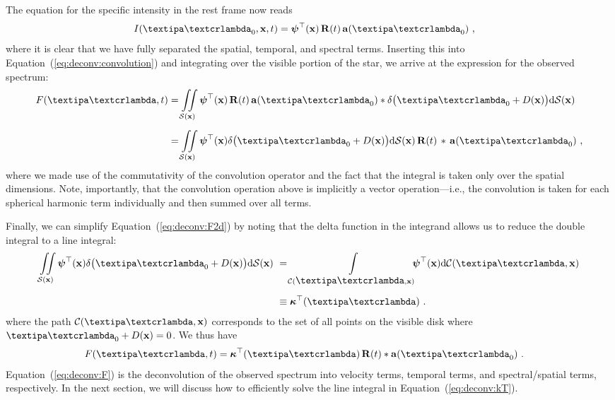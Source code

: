 \documentclass[modern]{aastex631}
\begin{document}
The equation for the specific intensity in the rest frame now reads
%
\begin{align}
    \label{eq:deconv:Ivecfull}
    I(\lnlam_0, \x, t) & =
    \ylmbasis(\x)
    \,
    \R(t)
    \,
    \alm(\lnlam_0)
    \quad ,
\end{align}
%
where it is clear that we have fully separated the spatial, temporal, and spectral terms. 
Inserting this into Equation~(\ref{eq:deconv:convolution})
and integrating over the visible portion of the star, we arrive at the expression for the observed spectrum:
%
%
\begin{align}
    \label{eq:deconv:F2d}
    F(\lnlam, t) & =
    \iint\limits_{\Surf(\x)}
    \ylmbasis(\x)
    \,
    \R(t)
    \,
    \almt(\lnlam_0)
    * \delta\big(\lnlam_0 + \D(\x)\big)
    \mathrm{d}\Surf(\x)
    \nonumber                \\[0.5em]
                         & =
    \iint\limits_{\Surf(\x)}
    \ylmbasis(\x)
    \delta\big(\lnlam_0 + \D(\x)\big)
    \mathrm{d}\Surf(\x)
    \,
    \R(t)
    \,
    *
    \,
    \alm(\lnlam_0)
    \quad ,
\end{align}
%
%
where we made use of the commutativity of the convolution operator and the fact that the integral is taken only over the spatial dimensions.
Note, importantly, that the convolution operation above is implicitly a vector operation---i.e., the convolution is taken for each spherical harmonic term individually and then summed over all terms.

Finally, we can simplify Equation~(\ref{eq:deconv:F2d}) by noting that the delta function in the integrand allows us to reduce the double integral to a line integral:
%
\begin{align}
    \label{eq:deconv:kT}
    \iint\limits_{\Surf(\x)}
    \ylmbasis(\x)
    \delta\big(\lnlam_0 + \D(\x)\big)
    \mathrm{d}\Surf(\x)
    \, \,
     & =
    \int\limits_{\Curve(\lnlam, \x)}
    \hspace*{-0.6em}\ylmbasis(\x)
    \mathrm{d}\Curve(\lnlam, \x)
    \nonumber                     \\[0.5em]
     & \equiv \kT(\lnlam)
    \quad.
\end{align}
%
where the path $\Curve(\lnlam, \x)$ corresponds to the set of all points on the visible disk where $\lnlam_0 + \D(\x) = 0$.
%
We thus have
%
\begin{align}
    \label{eq:deconv:F}
    F(\lnlam, t)
     & =
    \kT(\lnlam) \, \R(t)
    *
    \alm(\lnlam_0)
    \quad.
\end{align}
%
Equation~(\ref{eq:deconv:F}) is the deconvolution of the observed spectrum into velocity terms, temporal terms, and spectral/spatial terms, respectively. 
In the next section, we will discuss how to efficiently solve the line integral in Equation~(\ref{eq:deconv:kT}).
\end{document}
